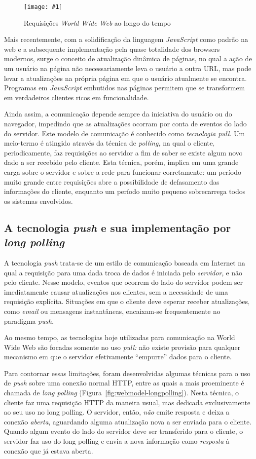 \documentclass[ruledheader, 12pt]{abnt}
\newcommand{\figcustom}[4]{\par
	\begin{figure}[#3]
		\centering
		\texttt{[image: \#1]}
		\caption{\label{fig:#1}#2}
	\end{figure}
\par}
\newcommand{\figref}[1]{(Figura~\ref{fig:#1})}
\begin{document}
\figcustom{webmodel-pull}{Requisições \emph{World Wide Web} ao longo do tempo}{tp}{.8}

Mais recentemente, com a solidificação da linguagem \emph{JavaScript} como padrão na web e a subsequente implementação pela quase totalidade dos browsers modernos, surge o conceito de atualização dinâmica de páginas, no qual a ação de um usuário na página não necessariamente leva o usuário a outra URL, mas pode levar a atualizações na própria página em que o usuário atualmente se encontra. Programas em \emph{JavaScript} embutidos nas páginas permitem que se transformem em verdadeiros clientes ricos em funcionalidade.

Ainda assim, a comunicação depende sempre da iniciativa do usuário ou do navegador, impedindo que as atualizações ocorram por conta de eventos do lado do servidor. Este modelo de comunicação é conhecido como \emph{tecnologia pull.} Um meio-termo é atingido através da técnica de \emph{polling,} na qual o cliente, periodicamente, faz requisições ao servidor a fim de saber se existe algum novo dado a ser recebido pelo cliente. Esta técnica, porém, implica em uma grande carga sobre o servidor e sobre a rede para funcionar corretamente: um período muito grande entre requisições abre a possibilidade de defasamento das informações do cliente, enquanto um período muito pequeno sobrecarrega todos os sistemas envolvidos.

\clearpage
\subsection{A tecnologia \emph{push} e sua implementação por \emph{long polling}}

A tecnologia \emph{push} trata-se de um estilo de comunicação baseada em Internet na qual a requisição para uma dada troca de dados é iniciada pelo \emph{servidor,} e não pelo cliente. Nesse modelo, eventos que ocorrem do lado do servidor podem ser imediatamente causar atualizações nos clientes, sem a necessidade de uma requisição explícita. Situações em que o cliente deve esperar receber atualizações, como \emph{email} ou mensagens instantâneas, encaixam-se frequentemente no paradigma \emph{push.}

Ao mesmo tempo, as tecnologias hoje utilizadas para comunicação na World Wide Web são focadas somente no uso \emph{pull:} não existe provisão para qualquer mecanismo em que o servidor efetivamente ``empurre'' dados para o cliente.

Para contornar essas limitações, foram desenvolvidas algumas técnicas para o uso de \emph{push} sobre uma conexão normal HTTP, entre as quais a mais proeminente é chamada de \emph{long polling} \figref{webmodel-longpolling}. Nesta técnica, o cliente faz uma requisição HTTP da maneira usual, mas dedicada exclusivamente ao seu uso no long polling. O servidor, então, \emph{não} emite resposta e deixa a conexão \emph{aberta}, aguardando alguma atualização nova a ser enviada para o cliente. Quando algum evento do lado do servidor deve ser transferido para o cliente, o servidor faz uso do long polling e envia a nova informação como \emph{resposta} à conexão que já estava aberta.
\end{document}
